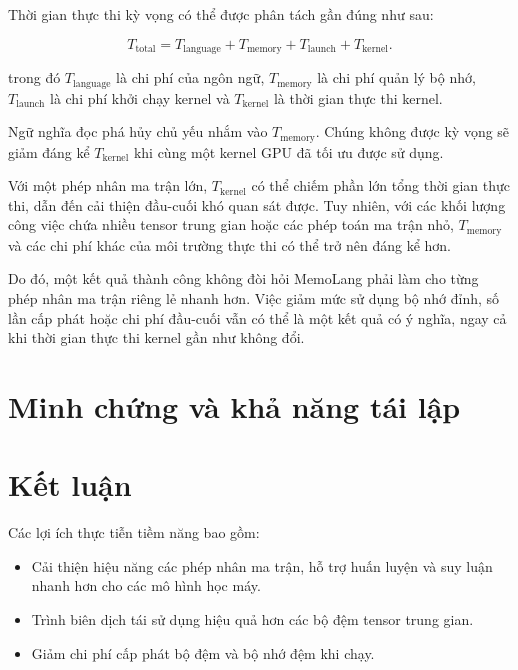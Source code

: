 \documentclass[a4paper]{article}
\begin{document}
	Thời gian thực thi kỳ vọng có thể được phân tách gần đúng như sau:
	
	\begin{equation}
		T_{\mathrm{total}} =
		T_{\mathrm{language}} +
		T_{\mathrm{memory}} +
		T_{\mathrm{launch}} +
		T_{\mathrm{kernel}}.
	\end{equation}
	
	\noindent trong đó $T_{\mathrm{language}}$ là chi phí của ngôn ngữ, $T_{\mathrm{memory}}$ là chi phí quản lý bộ nhớ, $T_{\mathrm{launch}}$ là chi phí khởi chạy kernel và $T_{\mathrm{kernel}}$ là thời gian thực thi kernel.
	
	Ngữ nghĩa đọc phá hủy chủ yếu nhắm vào $T_{\mathrm{memory}}$. Chúng không được kỳ vọng sẽ giảm đáng kể $T_{\mathrm{kernel}}$ khi cùng một kernel GPU đã tối ưu được sử dụng.
	
	Với một phép nhân ma trận lớn, $T_{\mathrm{kernel}}$ có thể chiếm phần lớn tổng thời gian thực thi, dẫn đến cải thiện đầu-cuối khó quan sát được. Tuy nhiên, với các khối lượng công việc chứa nhiều tensor trung gian hoặc các phép toán ma trận nhỏ, $T_{\mathrm{memory}}$ và các chi phí khác của môi trường thực thi có thể trở nên đáng kể hơn.
	
	Do đó, một kết quả thành công không đòi hỏi MemoLang phải làm cho từng phép nhân ma trận riêng lẻ nhanh hơn. Việc giảm mức sử dụng bộ nhớ đỉnh, số lần cấp phát hoặc chi phí đầu-cuối vẫn có thể là một kết quả có ý nghĩa, ngay cả khi thời gian thực thi kernel gần như không đổi.
	
	
	
		
	\section{Minh chứng và khả năng tái lập}
	\label{sec:evidence}
	
	
	
	\section{Kết luận}
	
	
	Các lợi ích thực tiễn tiềm năng bao gồm:
	
	\begin{itemize}
		\item Cải thiện hiệu năng các phép nhân ma trận, hỗ trợ huấn luyện và suy luận nhanh hơn cho các mô hình học máy.
		\item Trình biên dịch tái sử dụng hiệu quả hơn các bộ đệm tensor trung gian.
		\item Giảm chi phí cấp phát bộ đệm và bộ nhớ đệm khi chạy.
	\end{itemize}
	
\end{document}

